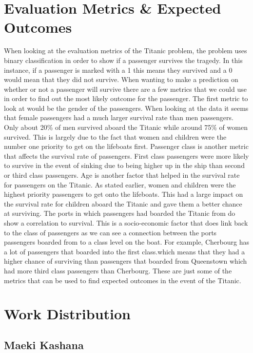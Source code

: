 \documentclass{APA}
\begin{document}
\section{Evaluation Metrics \& Expected Outcomes}
	When looking at the evaluation metrics of the Titanic problem, the problem uses binary classification in order to show if a passenger survives the tragedy. In this instance, if a passenger is marked with a 1 this means they survived and a 0 would mean that they did not survive. When wanting to make a prediction on whether or not a passenger will survive there are a few metrics that we could use in order to find out the most likely outcome for the passenger.
	The first metric to look at would be the gender of the passengers. When looking at the data it seems that female passengers had a much larger survival rate than men passengers. Only about 20\% of men survived aboard the Titanic while around 75\% of women survived. This is largely due to the fact that women and children were the number one priority to get on the lifeboats first. Passenger class is another metric that affects the survival rate of passengers. First class passengers were more likely to survive in the event of sinking due to being higher up in the ship than second or third class passengers. Age is another factor that helped in the survival rate for passengers on the Titanic. As stated earlier, women and children were the highest priority passengers to get onto the lifeboats. This had a large impact on the survival rate for children aboard the Titanic and gave them a better chance at surviving. The ports in which passengers had boarded the Titanic from do show a correlation to survival. This is a socio-economic factor that does link back to the class of passengers as we can see a connection between the ports passengers boarded from to a class level on the boat. For example, Cherbourg has a lot of passengers that boarded into the first class.which means that they had a higher chance of surviving than passengers that boarded from Queenstown which had more third class passengers than Cherbourg. These are just some of the metrics that can be used to find expected outcomes in the event of the Titanic.

\newpage



\section{Work Distribution}

\subsection{Maeki Kashana}
\end{document}
